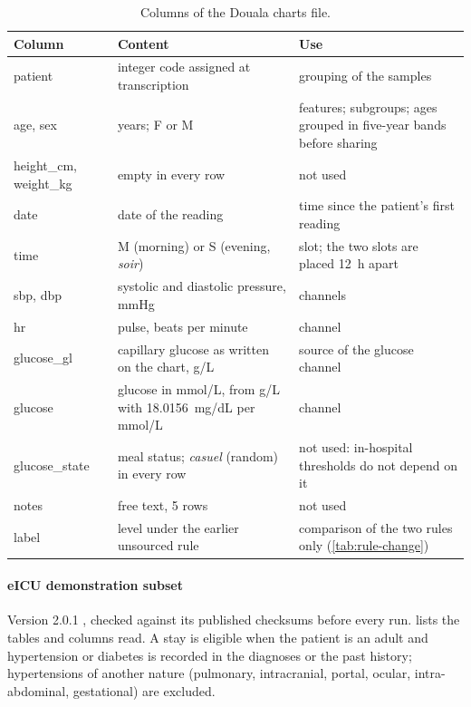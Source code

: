 \begin{table}[htbp]
\centering\footnotesize
\caption{Columns of the Douala charts file.}\label{tab:dict-douala}
\begin{tabularx}{\textwidth}{@{}>{\ttfamily\raggedright\arraybackslash}p{2.5cm} >{\raggedright\arraybackslash}X >{\raggedright\arraybackslash}p{4.6cm}@{}}
\toprule
\normalfont\textbf{Column} & \textbf{Content} & \textbf{Use} \\
\midrule
patient & integer code assigned at transcription & grouping of the samples \\
age, sex & years; F or M & features; subgroups; ages grouped in five-year bands before sharing \\
height\_cm, weight\_kg & empty in every row & not used \\
date & date of the reading & time since the patient's first reading \\
time & M (morning) or S (evening, \emph{soir}) & slot; the two slots are placed 12~h apart \\
sbp, dbp & systolic and diastolic pressure, mmHg & channels \\
hr & pulse, beats per minute & channel \\
glucose\_gl & capillary glucose as written on the chart, g/L & source of the glucose channel \\
glucose & glucose in mmol/L, from g/L with 18.0156~mg/dL per mmol/L & channel \\
glucose\_state & meal status; \emph{casuel} (random) in every row & not used: in-hospital thresholds do not depend on it \\
notes & free text, 5 rows & not used \\
label & level under the earlier unsourced rule & comparison of the two rules only (\cref{tab:rule-change}) \\
\bottomrule
\end{tabularx}
\end{table}

\paragraph{eICU demonstration subset} Version 2.0.1 \parencite{eicudemo}, checked against its published checksums before every run.  lists the tables and columns read. A stay is eligible when the patient is an adult and hypertension or diabetes is recorded in the diagnoses or the past history; hypertensions of another nature (pulmonary, intracranial, portal, ocular, intra-abdominal, gestational) are excluded.

